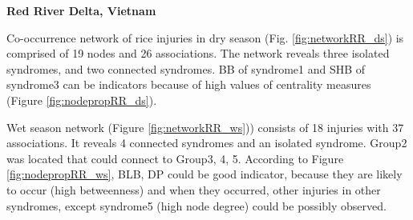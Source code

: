 \textbf{Red River Delta, Vietnam}
 
Co-occurrence network of rice injuries in dry season (Fig. \ref{fig:networkRR_ds}) is comprised of 19 nodes and 26 associations. The network reveals three isolated syndromes, and two connected syndromes. BB of syndrome1 and SHB of syndrome3 can be indicators because of high values of centrality measures (Figure \ref{fig:nodepropRR_ds}).

Wet season network (Figure \ref{fig:networkRR_ws})) consists of 18 injuries with 37 associations. It reveals 4 connected syndromes and an isolated syndrome. Group2 was located that could connect to Group3, 4, 5. According to Figure \ref{fig:nodepropRR_ws}, BLB, DP could be good indicator, because they are likely to occur (high betweenness) and when they occurred, other injuries in other syndromes, except syndrome5 (high node degree) could be possibly observed. 


